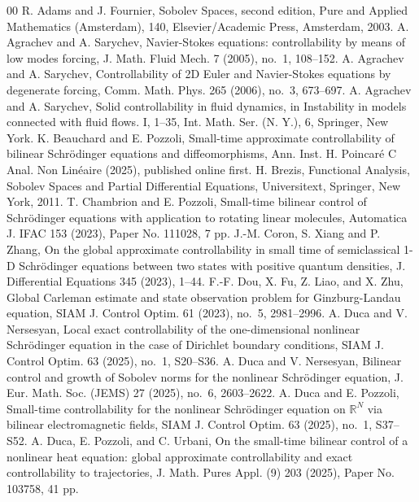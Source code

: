 \documentclass[review]{elsarticle}
\theoremstyle{dotless}
\def\R {\mathbb{R}}
\numberwithin{equation}{section}
\begin{document}
\begin{thebibliography}{00}
R. Adams and J. Fournier, Sobolev Spaces, second edition,  Pure and Applied Mathematics (Amsterdam), 140, Elsevier/Academic Press, Amsterdam, 2003.
A. Agrachev and A. Sarychev, Navier-Stokes equations: controllability by means of low modes forcing, J. Math. Fluid Mech. 7 (2005), no.~1, 108--152.
A. Agrachev and A. Sarychev, Controllability of 2D Euler and Navier-Stokes equations by degenerate forcing, Comm. Math. Phys. 265 (2006), no.~3, 673--697.
A. Agrachev and A. Sarychev, Solid controllability in fluid dynamics, in  Instability in models connected with fluid flows. I, 1--35, Int. Math. Ser. (N. Y.), 6, Springer, New York.
K. Beauchard and E. Pozzoli, Small-time approximate controllability of bilinear Schr\"odinger equations and diffeomorphisms, Ann. Inst. H. Poincaré C Anal. Non Linéaire (2025), published online first.
H. Brezis, Functional Analysis, Sobolev Spaces and Partial Differential Equations, Universitext, Springer, New York, 2011.
T. Chambrion and E. Pozzoli, Small-time bilinear control of Schr\"odinger equations with application to rotating linear molecules, Automatica J. IFAC 153 (2023), Paper No. 111028, 7 pp.
J.-M. Coron, S. Xiang and P. Zhang, On the global approximate controllability in small time of semiclassical 1-D Schr\"odinger equations between two states with positive quantum densities, J. Differential Equations 345 (2023), 1--44.
F.-F. Dou, X. Fu, Z. Liao, and X. Zhu, Global Carleman estimate and state observation problem for Ginzburg-Landau equation, SIAM J. Control Optim. 61 (2023), no.~5, 2981--2996.
A. Duca and V. Nersesyan, Local exact controllability of the one-dimensional nonlinear Schr\"odinger equation in the case of Dirichlet boundary conditions, SIAM J. Control Optim. 63 (2025), no.~1, S20--S36.
A. Duca and V. Nersesyan, Bilinear control and growth of Sobolev norms for the nonlinear Schr\"odinger equation, J. Eur. Math. Soc. (JEMS) 27 (2025), no.~6, 2603--2622. 
A. Duca and E. Pozzoli, Small-time controllability for the nonlinear Schr\"odinger equation on $\R^N$ via bilinear electromagnetic fields, SIAM J. Control Optim. 63 (2025), no.~1, S37--S52.
A. Duca, E. Pozzoli, and C. Urbani, On the small-time bilinear control of a nonlinear heat equation: global approximate controllability and exact controllability to trajectories, J. Math. Pures Appl. (9) 203 (2025), Paper No. 103758, 41 pp.

\end{thebibliography}
\end{document}
